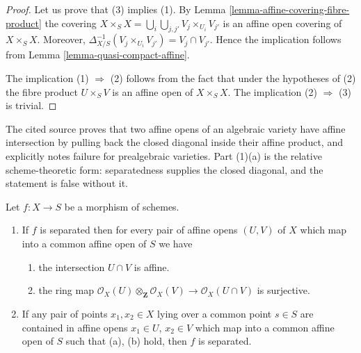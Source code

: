 \begin{proof}
Let us prove that (3) implies (1).
By Lemma \ref{lemma-affine-covering-fibre-product}
the covering $X \times_S X = \bigcup_i \bigcup_{j, j'} V_j \times_{U_i} V_{j'}$
is an affine open covering of $X \times_S X$.
Moreover, $\Delta_{X/S}^{-1}(V_j \times_{U_i} V_{j'}) = V_j \cap V_{j'}$.
Hence the implication follows from Lemma \ref{lemma-quasi-compact-affine}.

\medskip\noindent
The implication (1) $\Rightarrow$ (2) follows from the fact
that under the hypotheses of (2) the fibre product
$U \times_S V$ is an affine open of $X \times_S X$.
The implication (2) $\Rightarrow$ (3) is trivial.
\end{proof}

\begin{lemma}
\label{lemma-characterize-separated}
\begin{reference}
\cite[Chapter II, \S 3, no. 42, Proposition 1, p. 234]{FAC}
\end{reference}
\begin{history}
The cited source proves that two affine opens of an algebraic variety have
affine intersection by pulling back the closed diagonal inside their affine
product, and explicitly notes failure for prealgebraic varieties. Part (1)(a)
is the relative scheme-theoretic form: separatedness supplies the closed
diagonal, and the statement is false without it.
\end{history}
Let $f : X \to S$ be a morphism of schemes.
\begin{enumerate}
\item If $f$ is separated then for every pair of affine
opens $(U, V)$ of $X$ which map into a
common affine open of $S$ we have
\begin{enumerate}
\item the intersection $U \cap V$ is affine.
\item the ring map
$\mathcal{O}_X(U) \otimes_{\mathbf{Z}} \mathcal{O}_X(V)
\to \mathcal{O}_X(U \cap V)$
is surjective.
\end{enumerate}
\item If any pair of points $x_1, x_2 \in X$ lying over a common
point $s \in S$ are contained in affine opens $x_1 \in U$,
$x_2 \in V$ which map into a common affine open of $S$ such
that (a), (b) hold, then $f$ is separated.
\end{enumerate}
\end{lemma}

